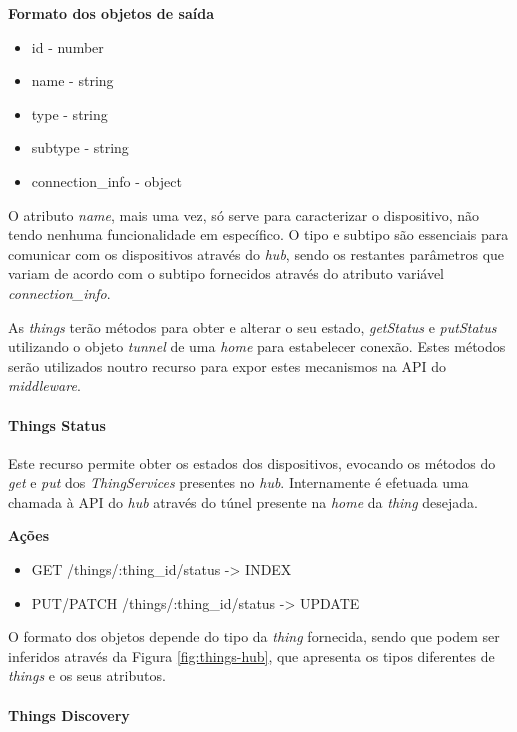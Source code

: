 \textbf{Formato dos objetos de saída}
\begin{itemize}
    \item id - number
    \item name - string
    \item type - string
    \item subtype - string
    \item connection{\_}info - object
\end{itemize}

O atributo \textit{name}, mais uma vez, só serve para caracterizar o dispositivo, não tendo nenhuma funcionalidade em específico. O tipo e subtipo são essenciais para comunicar com os dispositivos através do \textit{hub}, sendo os restantes parâmetros que variam de acordo com o subtipo fornecidos através do atributo variável \textit{connection{\_}info}.

As \textit{things} terão métodos para obter e alterar o seu estado, \textit{getStatus} e \textit{putStatus} utilizando o objeto \textit{tunnel} de uma \textit{home} para estabelecer conexão. Estes métodos serão utilizados noutro recurso para expor estes mecanismos na API do \textit{middleware}.

\paragraph*{Things Status}

Este recurso permite obter os estados dos dispositivos, evocando os métodos do \textit{get} e \textit{put} dos \textit{ThingServices} presentes no \textit{hub}. Internamente é efetuada uma chamada à API do \textit{hub} através do túnel presente na \textit{home} da \textit{thing} desejada.

\textbf{Ações}
\begin{itemize}
    \item GET /things/:thing{\_}id/status -> INDEX
    \item PUT/PATCH /things/:thing{\_}id/status -> UPDATE
\end{itemize}

O formato dos objetos depende do tipo da \textit{thing} fornecida, sendo que  podem ser inferidos através da Figura \ref{fig:things-hub}, que apresenta os tipos diferentes de \textit{things} e os seus atributos.

\paragraph*{Things Discovery}

